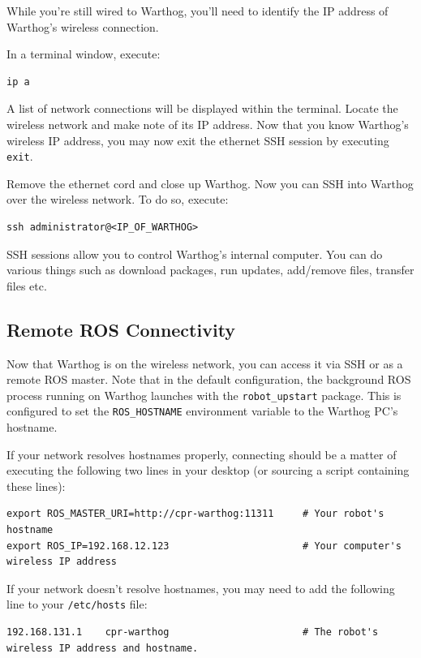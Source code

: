 \documentclass[]{clearpath-latex/clearpath-manual}
\begin{document}
While you're still wired to Warthog, you'll need to identify the IP address of Warthog's wireless connection.

In a terminal window, execute:

\begin{lstlisting}
ip a
\end{lstlisting}

A list of network connections will be displayed within the terminal. Locate the wireless network and make note of its IP address. Now that you know Warthog's wireless IP address, you may now exit the ethernet SSH session by executing \lstinline{exit}.

Remove the ethernet cord and close up Warthog.   Now you can SSH into Warthog over the wireless network.  To do so, execute:

\begin{lstlisting}
ssh administrator@<IP_OF_WARTHOG>
\end{lstlisting}

SSH sessions allow you to control Warthog's internal computer.  You can do various things such as download packages, run updates, add/remove files, transfer files etc.

\subsection{Remote ROS Connectivity}

Now that Warthog is on the wireless network, you can access it via SSH or as a remote ROS master. Note that in the default configuration, the background ROS process running on Warthog launches with the \lstinline{robot_upstart} package. This is configured to set the \lstinline{ROS_HOSTNAME} environment variable to the Warthog PC's hostname.

If your network resolves hostnames properly, connecting should be a matter of executing the following two lines in your desktop (or sourcing a script containing these lines):

\begin{lstlisting}
export ROS_MASTER_URI=http://cpr-warthog:11311     # Your robot's hostname
export ROS_IP=192.168.12.123                       # Your computer's wireless IP address
\end{lstlisting}

If your network doesn't resolve hostnames, you may need to add the following line to your \lstinline{/etc/hosts} file:

\begin{lstlisting}
192.168.131.1    cpr-warthog                       # The robot's wireless IP address and hostname.
\end{lstlisting}
\end{document}
